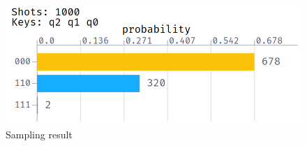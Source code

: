 \begin{figure}[h]
    \begin{center}
        \includegraphics[width=0.9\linewidth]{images/2_6_sampling_res.png}
    \end{center}
    \caption{Sampling result}
\end{figure}

